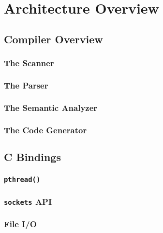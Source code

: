 \chapter{Architecture Overview}

\section{Compiler Overview}
	\subsection{The Scanner}

	\subsection{The Parser}

	\subsection{The Semantic Analyzer}

	\subsection{The Code Generator}

\section{C Bindings}

	\subsection{\texttt{pthread()}}

	\subsection{\texttt{sockets} API}

	\subsection{File I/O}

